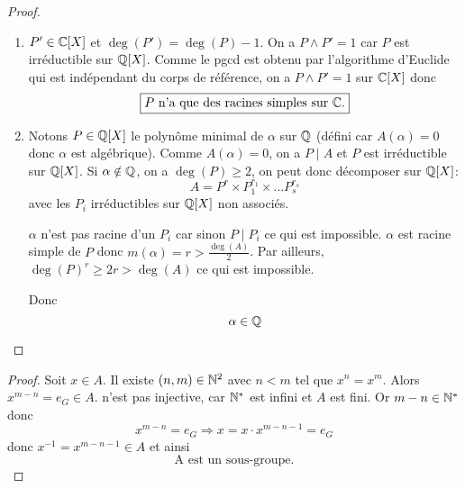 \documentclass[12pt]{article}
\begin{document}
\begin{proof}
	\phantom{}
	\begin{enumerate}
		\item $P'\in\mathbb{C}[X]$ et $\deg(P')=\deg(P)-1$. On a $P\wedge P'=1$ car $P$ est irréductible sur $\mathbb{Q}[X]$. Comme le pgcd est obtenu par l'algorithme d'Euclide qui est indépendant du corps de référence, on a $P\wedge P'=1$ sur $\mathbb{C}[X]$ donc 
		\begin{equation}
			\boxed{P\text{ n'a que des racines simples sur }\mathbb{C}.}
		\end{equation}
		\item Notons $P\in\mathbb{Q}[X]$ le polynôme minimal de $\alpha$ sur $\mathbb{Q}$ (défini car $A(\alpha)=0$ donc $\alpha$ est algébrique). Comme $A(\alpha)=0$, on a $P\mid A$ et $P$ est irréductible sur $\mathbb{Q}[X]$. Si $\alpha\notin\mathbb{Q}$, on a $\deg(P)\geqslant2$, on peut donc décomposer sur $\mathbb{Q}[X]$:
		\begin{equation}
			A=P^{r}\times P_{1}^{r_{1}}\times\dots P_{s}^{r_{s}}
		\end{equation}
		avec les $P_{i}$ irréductibles sur $\mathbb{Q}[X]$ non associés.

		$\alpha$ n'est pas racine d'un $P_{i}$ car sinon $P\mid P_{i}$ ce qui est impossible. $\alpha$ est racine simple de $P$ donc $m(\alpha)=r>\frac{\deg(A)}{2}$. Par ailleurs, $\deg(P)^{r}\geqslant2r>\deg(A)$ ce qui est impossible.

		Donc 
		\begin{equation}
			\alpha\in\mathbb{Q}
		\end{equation}
	\end{enumerate}
\end{proof}

\begin{proof}
	Soit $x\in A$. Il existe $(n,m)\in\mathbb{N}^{2}$ avec $n<m$ tel que $x^{n}=x^{m}$. Alors $x^{m-n}=e_{G}\in A$.
	n'est pas injective, car $\mathbb{N}^{*}$ est infini et $A$ est fini. Or $m-n\in\mathbb{N}^{*}$ donc
	\begin{equation}
		x^{m-n}=e_{G}\Rightarrow x=x\cdot x^{m-n-1}=e_{G}
	\end{equation}
	donc $x^{-1}=x^{m-n-1}\in A$ et ainsi 
	\begin{equation}
		\boxed{\text{A est un sous-groupe.}}
	\end{equation}
\end{proof}
\end{document}
